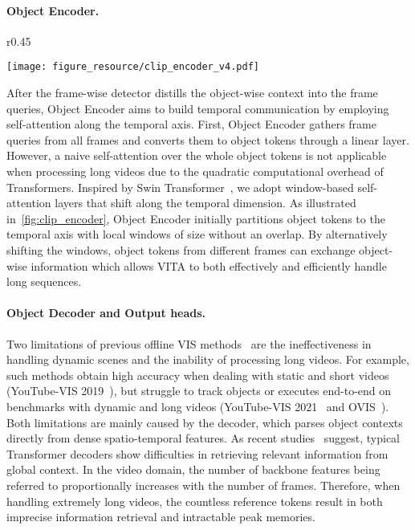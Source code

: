 \documentclass{article}
\begin{document}
\paragraph{Object Encoder.}
\begin{wrapfigure}{r}{0.45\textwidth}
  \begin{center}
    \vspace{-6mm}
    \texttt{[image: figure\_resource/clip\_encoder\_v4.pdf]}
  \end{center}
  \vspace{-3mm}
  \caption{
    Illustration of an Object Encoder layer.
    Blocks with dashed line are local windows, and  indicates an object token.
  }
  \vspace{-5mm}
  \label{fig:clip_encoder}
\end{wrapfigure}
After the frame-wise detector distills the object-wise context into the frame queries, Object Encoder aims to build temporal communication by employing self-attention along the temporal axis.
First, Object Encoder gathers frame queries from all frames and converts them to object tokens through a linear layer.
However, a naive self-attention over the whole  object tokens is not applicable when processing long videos due to the quadratic computational overhead of Transformers.
Inspired by Swin Transformer~\cite{Swin}, we adopt window-based self-attention layers that shift along the temporal dimension.
As illustrated in~\cref{fig:clip_encoder}, Object Encoder initially partitions object tokens  to the temporal axis with local windows of size  without an overlap.
By alternatively shifting the windows, object tokens from different frames can exchange object-wise information which allows VITA to both effectively and efficiently handle long sequences.

\paragraph{Object Decoder and Output heads.}
Two limitations of previous offline VIS methods~\cite{VisTR, IFC, Mask2Former-VIS} are the ineffectiveness in handling dynamic scenes and the inability of processing long videos.
For example, such methods obtain high accuracy when dealing with static and short videos (YouTube-VIS 2019~\cite{MaskTrackRCNN}), but struggle to track objects or executes end-to-end on benchmarks with dynamic and long videos (YouTube-VIS 2021~\cite{MaskTrackRCNN} and OVIS~\cite{OVIS-Dataset}).
Both limitations are mainly caused by the decoder, which parses object contexts directly from dense spatio-temporal features.
As recent studies~\cite{SMCA, TSP-RCNN, Deformable-DETR} suggest, typical Transformer decoders show difficulties in retrieving relevant information from global context.
In the video domain, the number of backbone features being referred to proportionally increases with the number of frames.
Therefore, when handling extremely long videos, the countless reference tokens result in both imprecise information retrieval and intractable peak memories.
\end{document}
